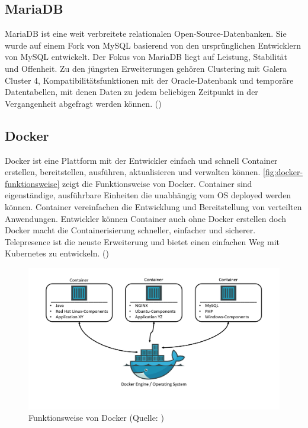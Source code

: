 \documentclass[a4paper, fontsize=11pt, parskip=half, twoside]{scrreprt}
\begin{document}
	\subsection{MariaDB}
	MariaDB ist eine weit verbreitete relationalen Open-Source-Datenbanken. 
	Sie wurde auf einem Fork von MySQL basierend von den ursprünglichen Entwicklern von MySQL entwickelt. 
	Der Fokus von MariaDB liegt auf Leistung, Stabilität und Offenheit. 
	Zu den jüngsten Erweiterungen gehören Clustering mit Galera Cluster 4, Kompatibilitätsfunktionen mit der Oracle-Datenbank und temporäre Datentabellen, mit denen Daten zu jedem beliebigen Zeitpunkt in der Vergangenheit abgefragt werden können. (\textcite{noauthor_mariadb_nodate})
	
	\subsection{Docker}
	Docker ist eine Plattform mit der Entwickler einfach und schnell Container erstellen, bereitstellen, ausführen, aktualisieren und verwalten können.
	\autoref{fig:docker-funktionsweise} zeigt die Funktionsweise von Docker.
	Container sind eigenständige, ausführbare Einheiten die unabhängig vom OS deployed werden können.
	Container vereinfachen die Entwicklung und Bereitstellung von verteilten Anwendungen. 
	Entwickler können Container auch ohne Docker erstellen doch Docker macht die Containerisierung schneller, einfacher und sicherer. 
	Telepresence ist die neuste Erweiterung und bietet einen einfachen Weg mit Kubernetes zu entwickeln. (\textcite{ghosh_docker_2020})
	
	\begin{figure}[ht]
		\centering
		\includegraphics[scale=0.4]{assets/docker-funktionsweise.png}
		\caption{Funktionsweise von Docker (Quelle: \textcite{bollhoff_kubernetes_2022})}
		\label{fig:docker-funktionsweise}
	\end{figure}
	
\end{document}
